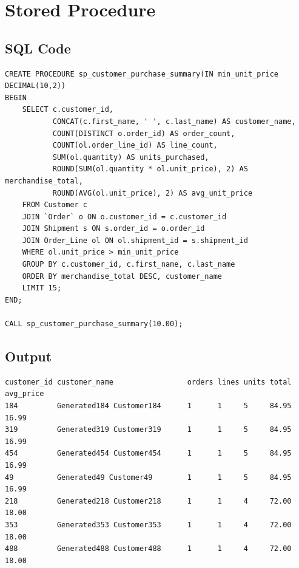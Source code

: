 \section{Stored Procedure}

\subsection{SQL Code}
{\scriptsize
\begin{verbatim}
CREATE PROCEDURE sp_customer_purchase_summary(IN min_unit_price DECIMAL(10,2))
BEGIN
    SELECT c.customer_id,
           CONCAT(c.first_name, ' ', c.last_name) AS customer_name,
           COUNT(DISTINCT o.order_id) AS order_count,
           COUNT(ol.order_line_id) AS line_count,
           SUM(ol.quantity) AS units_purchased,
           ROUND(SUM(ol.quantity * ol.unit_price), 2) AS merchandise_total,
           ROUND(AVG(ol.unit_price), 2) AS avg_unit_price
    FROM Customer c
    JOIN `Order` o ON o.customer_id = c.customer_id
    JOIN Shipment s ON s.order_id = o.order_id
    JOIN Order_Line ol ON ol.shipment_id = s.shipment_id
    WHERE ol.unit_price > min_unit_price
    GROUP BY c.customer_id, c.first_name, c.last_name
    ORDER BY merchandise_total DESC, customer_name
    LIMIT 15;
END;

CALL sp_customer_purchase_summary(10.00);
\end{verbatim}
}

\subsection{Output}
{\scriptsize
\begin{verbatim}
customer_id customer_name                 orders lines units total avg_price
184         Generated184 Customer184      1      1     5     84.95 16.99
319         Generated319 Customer319      1      1     5     84.95 16.99
454         Generated454 Customer454      1      1     5     84.95 16.99
49          Generated49 Customer49        1      1     5     84.95 16.99
218         Generated218 Customer218      1      1     4     72.00 18.00
353         Generated353 Customer353      1      1     4     72.00 18.00
488         Generated488 Customer488      1      1     4     72.00 18.00
\end{verbatim}
}
